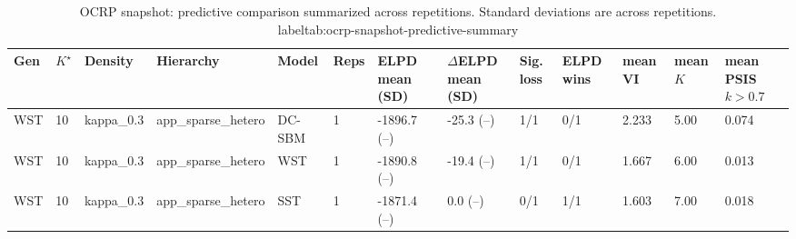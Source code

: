 \begin{table}[!h]
\centering
\caption{OCRP snapshot: predictive comparison summarized across repetitions. Standard deviations are across repetitions.\\label{tab:ocrp-snapshot-predictive-summary}}
\centering
\begin{tabular}[t]{lllllllllllll}
\toprule
Gen & $K^\star$ & Density & Hierarchy & Model & Reps & ELPD mean (SD) & $\Delta$ELPD mean (SD) & Sig. loss & ELPD wins & mean VI & mean $\hat K$ & mean PSIS $k>0.7$\\
\midrule
WST & 10 & kappa_0.3 & app_sparse_hetero & DC-SBM & 1 & -1896.7 (--) & -25.3 (--) & 1/1 & 0/1 & 2.233 & 5.00 & 0.074\\
WST & 10 & kappa_0.3 & app_sparse_hetero & WST & 1 & -1890.8 (--) & -19.4 (--) & 1/1 & 0/1 & 1.667 & 6.00 & 0.013\\
WST & 10 & kappa_0.3 & app_sparse_hetero & SST & 1 & -1871.4 (--) & 0.0 (--) & 0/1 & 1/1 & 1.603 & 7.00 & 0.018\\
\bottomrule
\end{tabular}
\end{table}
